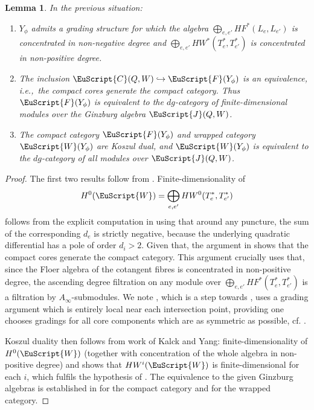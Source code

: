\documentclass[10pt,a4paper]{amsart}
\def\scrJ{\EuScript{J}}
\newcommand{\scrF}{\EuScript{F}}
\newcommand{\scrC}{\EuScript{C}}
\def\scrW{\EuScript{W}}
\newtheorem{lem}[thm]{Lemma}
\theoremstyle{definition}
\numberwithin{equation}{section}
\begin{document}
\begin{lem}\samepage
In the previous situation:
\begin{enumerate}\itemsep=0pt
\item[$(1)$] $Y_{\phi}$ admits a grading structure for which the algebra $\bigoplus_{e,e'} HF^*(L_e,L_{e'})$ is concentrated in non-negative degree and $\bigoplus_{e,e'} HW^*(T^*_e, T^*_{e'})$ is concentrated in non-positive degree.
\item[$(2)$] The inclusion $\scrC(Q,W) \hookrightarrow \scrF(Y_{\phi})$ is an equivalence, i.e.,~the compact cores generate the compact category. Thus $\scrF(Y_{\phi})$ is equivalent to the $dg$-category of finite-dimensional modules over the Ginzburg algebra $\scrJ(Q,W)$.
\item[$(3)$] The compact category $\scrF(Y_\phi)$ and wrapped category $\scrW(Y_{\phi})$ are Koszul dual, and $\scrW(Y_{\phi})$ is equivalent to the $dg$-category of all modules over $\scrJ(Q,W)$.
\end{enumerate}
\end{lem}

\begin{proof}
The first two results follow from \cite{AbSm-plumbing}. Finite-dimensionality of
\[
H^0(\scrW) = \bigoplus_{e,e'} HW^0(T^*_e,T^*_{e'})
\]
follows from the explicit computation in \cite{Karabas-Lee} using that around any puncture, the sum of the corresponding $d_e$ is strictly negative, because the underlying quadratic differential has a pole of order $d_i > 2$. Given that, the argument in \cite[Proposition~4.2 and Lemma~4.6]{AbSm-plumbing} shows that the compact cores generate the compact category. This argument crucially uses that, since the Floer algebra of the cotangent fibres is concentrated in non-positive degree, the ascending degree filtration on any module over $\bigoplus_{e,e'} HF^*(T^*_e, T^*_{e'})$ is a filtration by $A_{\infty}$-submodules. We note \cite[Lemma~4.12]{AbSm-plumbing}, which is a step towards \cite[Proposition~4.2]{AbSm-plumbing}, uses a grading argument which is entirely local near each intersection point, providing one chooses gradings for all core components which are as symmetric as possible, cf. \cite[equation~(4.19)]{AbSm-plumbing}.

Koszul duality then follows from work of Kalck and Yang: finite-dimensionality of $H^0(\scrW)$ (together with concentration of the whole algebra in non-positive degree) and \cite[Proposition~2.5]{Kalck-Yang} shows that $HW^i(\scrW)$ is finite-dimensional for each $i$, which fulfils the hypothesis of \cite[Theorems~2.7 and~2.8]{Kalck-Yang}. The equivalence to the given Ginzburg algebras is established in \cite{Smith:quiver} for the compact category and \cite{Christ, Karabas-Lee} for the wrapped category.
\end{proof}
\end{document}
